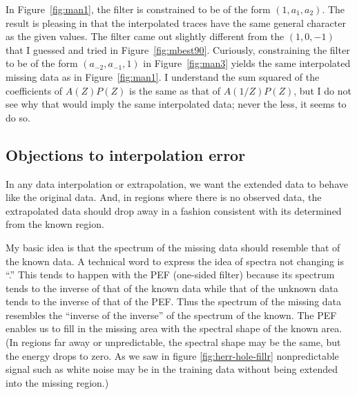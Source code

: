 \par
In Figure~\ref{fig:man1}, the filter is constrained
to be of the form $(1,a_1,a_2)$.
The result is pleasing in that the interpolated traces
have the same general character as the given values.
The filter came out slightly different from the $(1,0,-1)$
that I guessed and tried in Figure~\ref{fig:mbest90}.
Curiously, constraining the filter to be of the form $(a_{-2},a_{-1},1)$
in Figure~\ref{fig:man3}
yields the same interpolated missing data as in Figure~\ref{fig:man1}.
I understand the sum squared of the coefficients
of $A(Z)P(Z)$ is the same as that of $A(1/Z)P(Z)$, but I
do not see why that would imply the same interpolated data;
never the less, it seems to do so.

\subsection{Objections to interpolation error}
\par
In any data interpolation or extrapolation,
we want the extended data to behave like the original data.
And, in regions where there is no observed data,
the extrapolated data should drop away in a fashion
consistent with its  determined from the known region.

\par
My basic idea is that the spectrum of the missing data
should resemble that of the known data.
A technical word to express the idea
of spectra not changing is ``.''
This tends to happen with the PEF (one-sided filter)
because its spectrum tends to the inverse of that of the known data
while that of the unknown data
tends to the inverse of that of the PEF.
Thus the spectrum of the missing data
resembles the ``inverse of the inverse'' of the spectrum of the known.
The PEF enables us to fill in the missing area with
the spectral shape of the known area.
(In regions far away or unpredictable,
the spectral shape may be the same,
but the energy drops to zero.
As we saw in figure \ref{fig:herr-hole-fillr}
nonpredictable signal such as white noise
may be in the training data without being extended into the missing region.)


